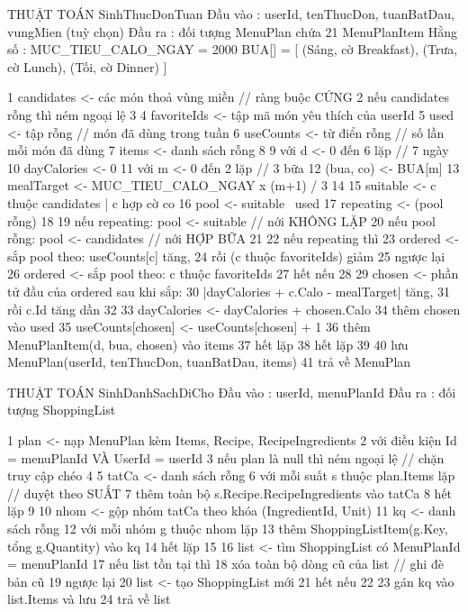 \begin{codeblock}
THUẬT TOÁN SinhThucDonTuan
Đầu vào : userId, tenThucDon, tuanBatDau, vungMien (tuỳ chọn)
Đầu ra  : đối tượng MenuPlan chứa 21 MenuPlanItem
Hằng số : MUC_TIEU_CALO_NGAY = 2000
          BUA[] = [ (Sáng, cờ Breakfast), (Trưa, cờ Lunch),
                    (Tối, cờ Dinner) ]

 1  candidates <- các món thoả vùng miền   // ràng buộc CỨNG
 2  nếu candidates rỗng thì ném ngoại lệ
 3
 4  favoriteIds <- tập mã món yêu thích của userId
 5  used      <- tập rỗng      // món đã dùng trong tuần
 6  useCounts <- từ điển rỗng  // số lần mỗi món đã dùng
 7  items     <- danh sách rỗng
 8
 9  với d <- 0 đến 6 lặp                   // 7 ngày
10      dayCalories <- 0
11      với m <- 0 đến 2 lặp               // 3 bữa
12          (bua, co) <- BUA[m]
13          mealTarget <- MUC_TIEU_CALO_NGAY x (m+1) / 3
14
15          suitable <- { c thuộc candidates | c hợp cờ co }
16          pool     <- suitable \ used
17          repeating <- (pool rỗng)
18
19          nếu repeating: pool <- suitable   // nới KHÔNG LẶP
20          nếu pool rỗng: pool <- candidates // nới HỢP BỮA
21
22          nếu repeating thì
23              ordered <- sắp pool theo: useCounts[c] tăng,
24                            rồi (c thuộc favoriteIds) giảm
25          ngược lại
26              ordered <- sắp pool theo: c thuộc favoriteIds
27          hết nếu
28
29          chosen <- phần tử đầu của ordered sau khi sắp:
30                  |dayCalories + c.Calo - mealTarget| tăng,
31                    rồi c.Id tăng dần
32
33          dayCalories <- dayCalories + chosen.Calo
34          thêm chosen vào used
35          useCounts[chosen] <- useCounts[chosen] + 1
36          thêm MenuPlanItem(d, bua, chosen) vào items
37      hết lặp
38  hết lặp
39
40  lưu MenuPlan(userId, tenThucDon, tuanBatDau, items)
41  trả về MenuPlan
\end{codeblock}


\begin{codeblock}
THUẬT TOÁN SinhDanhSachDiCho
Đầu vào : userId, menuPlanId
Đầu ra  : đối tượng ShoppingList

 1  plan <- nạp MenuPlan kèm Items, Recipe, RecipeIngredients
 2          với điều kiện Id = menuPlanId VÀ UserId = userId
 3  nếu plan là null thì ném ngoại lệ  // chặn truy cập chéo
 4
 5  tatCa <- danh sách rỗng
 6  với mỗi suất s thuộc plan.Items lặp  // duyệt theo SUẤT
 7      thêm toàn bộ s.Recipe.RecipeIngredients vào tatCa
 8  hết lặp
 9
10  nhom <- gộp nhóm tatCa theo khóa (IngredientId, Unit)
11  kq <- danh sách rỗng
12  với mỗi nhóm g thuộc nhom lặp
13      thêm ShoppingListItem(g.Key, tổng g.Quantity) vào kq
14  hết lặp
15
16  list <- tìm ShoppingList có MenuPlanId = menuPlanId
17  nếu list tồn tại thì
18      xóa toàn bộ dòng cũ của list      // ghi đè bản cũ
19  ngược lại
20      list <- tạo ShoppingList mới
21  hết nếu
22
23  gán kq vào list.Items và lưu
24  trả về list
\end{codeblock}
